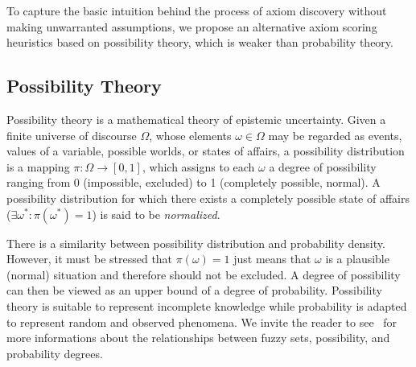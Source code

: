 \documentclass{llncs}
\begin{document}

To capture the basic intuition behind the process of axiom discovery without
making unwarranted assumptions, we propose an alternative axiom scoring heuristics
based on possibility theory, which is weaker than probability theory.

\subsection{Possibility Theory}
\label{PossibilityTheory}

Possibility theory \cite{Zadeh1978} is a mathematical theory of epistemic uncertainty.
Given a finite universe of discourse $\Omega$, whose elements $\omega\in\Omega$
may be regarded as events, values of a variable, possible worlds, or states of affairs,
a possibility distribution is a mapping $\pi: \Omega \to [0, 1]$,
which assigns to each $\omega$ a degree of possibility ranging from 0 (impossible,
excluded) to 1 (completely possible, normal).
A possibility distribution for  which there exists a completely possible state of
affairs ($\exists \omega^*: \pi(\omega^*) = 1$) is said to be \emph{normalized}.

There is a similarity between possibility distribution and probability 
density. However, it must be stressed that $\pi(\omega) = 1$ just means that
$\omega$ is a plausible (normal) situation and therefore should not be excluded.
A degree of possibility can then be viewed as an upper bound of a degree of probability.
Possibility theory is suitable to represent incomplete knowledge while 
probability is adapted to represent random and observed phenomena. 
We invite the reader to see~\cite{dubois1991} for more informations
about the relationships between fuzzy sets, possibility, and probability 
degrees.
\end{document}
